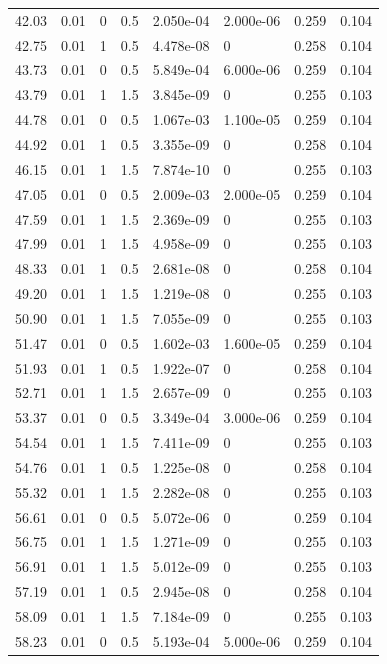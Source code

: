 \documentclass[preview]{standalone}
\begin{document}
{{{\begin{tabular}{L{1.2cm}C{1.2cm} C{0.3cm}C{0.5cm} C{1.4cm}C{1.4cm} C{1.4cm}C{1.4cm}}
  42.03  &  0.01  & 0     & 0.5 &  2.050e-04  & 2.000e-06  & 0.259 &  0.104   \\ 
  42.75  &  0.01  & 1     & 0.5 &  4.478e-08  & 0  & 0.258 &  0.104   \\ 
  43.73  &  0.01  & 0     & 0.5 &  5.849e-04  & 6.000e-06  & 0.259 &  0.104   \\ 
  43.79  &  0.01  & 1     & 1.5 &  3.845e-09  & 0  & 0.255 &  0.103   \\ 
  44.78  &  0.01  & 0     & 0.5 &  1.067e-03  & 1.100e-05  & 0.259 &  0.104   \\ 
  44.92  &  0.01  & 1     & 0.5 &  3.355e-09  & 0  & 0.258 &  0.104   \\ 
  46.15  &  0.01  & 1     & 1.5 &  7.874e-10  & 0  & 0.255 &  0.103   \\ 
  47.05  &  0.01  & 0     & 0.5 &  2.009e-03  & 2.000e-05  & 0.259 &  0.104   \\ 
  47.59  &  0.01  & 1     & 1.5 &  2.369e-09  & 0  & 0.255 &  0.103   \\ 
  47.99  &  0.01  & 1     & 1.5 &  4.958e-09  & 0  & 0.255 &  0.103   \\ 
  48.33  &  0.01  & 1     & 0.5 &  2.681e-08  & 0  & 0.258 &  0.104   \\ 
  49.20  &  0.01  & 1     & 1.5 &  1.219e-08  & 0  & 0.255 &  0.103   \\ 
  50.90  &  0.01  & 1     & 1.5 &  7.055e-09  & 0  & 0.255 &  0.103   \\ 
  51.47  &  0.01  & 0     & 0.5 &  1.602e-03  & 1.600e-05  & 0.259 &  0.104   \\ 
  51.93  &  0.01  & 1     & 0.5 &  1.922e-07  & 0  & 0.258 &  0.104   \\ 
  52.71  &  0.01  & 1     & 1.5 &  2.657e-09  & 0  & 0.255 &  0.103   \\ 
  53.37  &  0.01  & 0     & 0.5 &  3.349e-04  & 3.000e-06  & 0.259 &  0.104   \\ 
  54.54  &  0.01  & 1     & 1.5 &  7.411e-09  & 0  & 0.255 &  0.103   \\ 
  54.76  &  0.01  & 1     & 0.5 &  1.225e-08  & 0  & 0.258 &  0.104   \\ 
  55.32  &  0.01  & 1     & 1.5 &  2.282e-08  & 0  & 0.255 &  0.103   \\ 
  56.61  &  0.01  & 0     & 0.5 &  5.072e-06  & 0  & 0.259 &  0.104   \\ 
  56.75  &  0.01  & 1     & 1.5 &  1.271e-09  & 0  & 0.255 &  0.103   \\ 
  56.91  &  0.01  & 1     & 1.5 &  5.012e-09  & 0  & 0.255 &  0.103   \\ 
  57.19  &  0.01  & 1     & 0.5 &  2.945e-08  & 0  & 0.258 &  0.104   \\ 
  58.09  &  0.01  & 1     & 1.5 &  7.184e-09  & 0  & 0.255 &  0.103   \\ 
  58.23  &  0.01  & 0     & 0.5 &  5.193e-04  & 5.000e-06  & 0.259 &  0.104   \\ 
\hline 
\end{tabular} 

}}}
\end{document}
